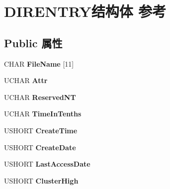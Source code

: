 \hypertarget{struct_d_i_r_e_n_t_r_y}{}\section{D\+I\+R\+E\+N\+T\+R\+Y结构体 参考}
\label{struct_d_i_r_e_n_t_r_y}
\subsection*{Public 属性}
\begin{DoxyCompactItemize}
\item 
\mbox{\label{struct_d_i_r_e_n_t_r_y_a33fcb60c54b1067cd968b0d4f80b5aaa}} 
C\+H\+AR {\bfseries File\+Name} \mbox{[}11\mbox{]}
\item 
\mbox{\label{struct_d_i_r_e_n_t_r_y_afd82e518bbac9188525a9f110c3091d4}} 
U\+C\+H\+AR {\bfseries Attr}
\item 
\mbox{\label{struct_d_i_r_e_n_t_r_y_a03fb6452a4ee81018dc32a7086daefc9}} 
U\+C\+H\+AR {\bfseries Reserved\+NT}
\item 
\mbox{\label{struct_d_i_r_e_n_t_r_y_a09affc4910be67b9e8c748349404b124}} 
U\+C\+H\+AR {\bfseries Time\+In\+Tenths}
\item 
\mbox{\label{struct_d_i_r_e_n_t_r_y_a16c8751ee71a895be75a150e39f03d3e}} 
U\+S\+H\+O\+RT {\bfseries Create\+Time}
\item 
\mbox{\label{struct_d_i_r_e_n_t_r_y_a7e06d89b75c83ae9ee37a1c457da90a0}} 
U\+S\+H\+O\+RT {\bfseries Create\+Date}
\item 
\mbox{\label{struct_d_i_r_e_n_t_r_y_a141191868edd45fd409ccacca4e4ef05}} 
U\+S\+H\+O\+RT {\bfseries Last\+Access\+Date}
\item 
\mbox{\label{struct_d_i_r_e_n_t_r_y_aff643320bac5747c6232703503555c4c}} 
U\+S\+H\+O\+RT {\bfseries Cluster\+High}
\item 
\mbox{\label{struct_d_i_r_e_n_t_r_y_ae9e4c2c0c77790d40c68fe95b0ef3b1f}} 

\end{DoxyCompactItemize}
